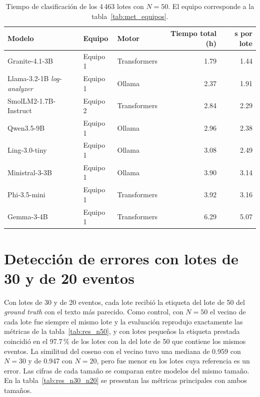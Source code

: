 \begin{table}[H]
\centering
\caption{Tiempo de clasificación de los 4\,463 lotes con $N = 50$. El equipo corresponde a la tabla~\ref{tab:met_equipos}.}
\label{tab:res_tiempos}
\small
\begin{tabular}{@{}lllrr@{}}
\toprule
\textbf{Modelo} & \textbf{Equipo} & \textbf{Motor} & \textbf{Tiempo total (h)} & \textbf{s por lote} \\
\midrule
Granite-4.1-3B & Equipo 1 & Transformers & 1.79 & 1.44 \\
Llama-3.2-1B \textit{log-analyzer} & Equipo 1 & Ollama & 2.37 & 1.91 \\
SmolLM2-1.7B-Instruct & Equipo 2 & Transformers & 2.84 & 2.29 \\
Qwen3.5-9B & Equipo 1 & Ollama & 2.96 & 2.38 \\
Ling-3.0-tiny & Equipo 1 & Ollama & 3.08 & 2.49 \\
Ministral-3-3B & Equipo 1 & Ollama & 3.90 & 3.14 \\
Phi-3.5-mini & Equipo 1 & Transformers & 3.92 & 3.16 \\
Gemma-3-4B & Equipo 1 & Transformers & 6.29 & 5.07 \\
\bottomrule
\end{tabular}
\normalsize
\end{table}

\section{Detección de errores con lotes de 30 y de 20 eventos}\label{sec:res_n30_n20}

Con lotes de 30 y de 20 eventos, cada lote recibió la etiqueta del lote de 50 del \textit{ground truth} con el texto más parecido. Como control, con $N = 50$ el vecino de cada lote fue siempre el mismo lote y la evaluación reprodujo exactamente las métricas de la tabla~\ref{tab:res_n50}, y con lotes pequeños la etiqueta prestada coincidió en el 97.7\,\% de los lotes con la del lote de 50 que contiene los mismos eventos. La similitud del coseno con el vecino tuvo una mediana de 0.959 con $N = 30$ y de 0.947 con $N = 20$, pero fue menor en los lotes cuya referencia es un error. Las cifras de cada tamaño se comparan entre modelos del mismo tamaño. En la tabla~\ref{tab:res_n30_n20} se presentan las métricas principales con ambos tamaños.


